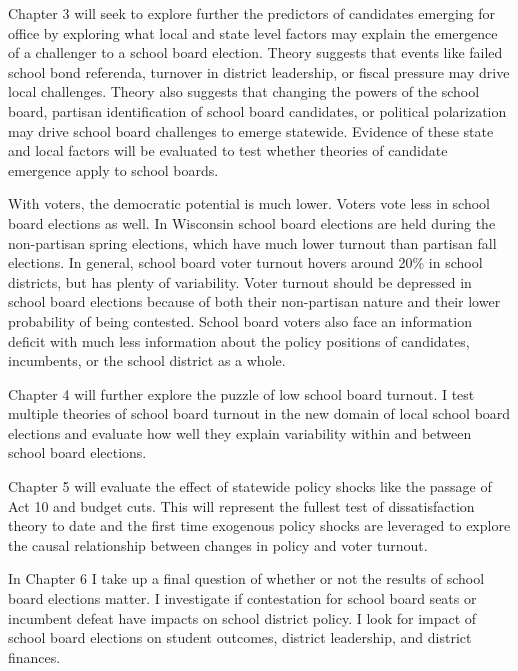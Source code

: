 Chapter 3 will seek to explore further the predictors of candidates 
emerging for office by exploring what local and state level factors may explain the 
emergence of a challenger to a school board election. Theory suggests that events 
like failed school bond referenda, turnover in district leadership, or fiscal pressure 
may drive local challenges. Theory also suggests that changing the powers of 
the school board, partisan identification of school board candidates, or 
political polarization may drive school board challenges to emerge statewide. 
Evidence of these state and local factors will be evaluated to test whether 
theories of candidate emergence apply to school boards. 

With voters, the democratic potential is much lower. Voters vote less in 
school board elections as well. In Wisconsin school board elections 
are held during the non-partisan spring elections, which have much lower turnout 
than partisan fall elections. In general, school board voter turnout hovers around 
20\% in school districts, but has plenty of variability. Voter turnout should be 
depressed in school board elections because of both their non-partisan nature and 
their lower probability of being contested. School board voters also face an 
information deficit with much less information about the policy positions of 
candidates, incumbents, or the school district as a whole. 

Chapter 4 will further explore the puzzle of low school board turnout. I test 
multiple theories of school board turnout in the new domain of local school 
board elections and evaluate how well they explain variability within and between 
school board elections. 

Chapter 5 will evaluate the effect of statewide policy shocks like the passage 
of Act 10 and budget cuts. This will represent the fullest test of dissatisfaction 
theory to date and the first time exogenous policy shocks are leveraged to 
explore the causal relationship between changes in policy and voter turnout. 

In Chapter 6 I take up a final question of whether or not the results of school 
board elections matter. I investigate if contestation for school board seats 
or incumbent defeat have impacts on school district policy. I look for impact 
of school board elections on student outcomes, district leadership, and district 
finances. 

